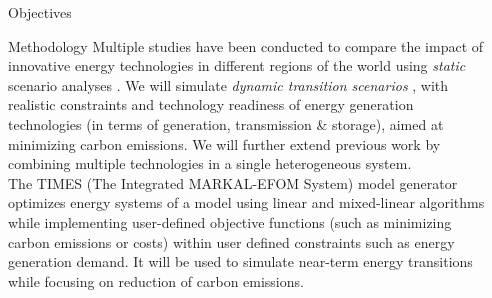 \documentclass[final]{beamer}
\newlength{\sepwid}
\newlength{\onecolwid}
\newlength{\threecolwid}
\begin{document}
\begin{frame}[t]
\begin{columns}[t,totalwidth=\threecolwid]
\begin{column}{\onecolwid}
\begin{alertblock}{Objectives}
\end{alertblock}
%
%


\begin{block}{Methodology}
Multiple studies have been conducted to compare the impact of innovative energy technologies in different regions of the world using \textit{static} scenario analyses \cite{chyong_chi_dynamics_2009} \cite{feng_system_2013} \cite{kikuchi_simulation-based_2017} \cite{li_energy_2010} \cite{pambudi_impact_2017} \cite{pambudi_future_2016}. We will simulate \textit{dynamic transition scenarios} \cite{jebaraj_review_2006} \cite{pfenninger_energy_2014} , with realistic constraints and technology readiness of energy generation technologies (in terms of generation, transmission \& storage), aimed at minimizing carbon emissions. We will further extend previous work by combining multiple technologies in a single heterogeneous system.\\

The TIMES (The Integrated MARKAL-EFOM System) model generator \cite{loulou_documentation_2005} \cite{seebregts_energy/environmental_2002} optimizes energy systems of a model using linear and mixed-linear algorithms while implementing user-defined objective functions (such as minimizing carbon emissions or costs) within user defined constraints such as energy generation demand. It will be used to simulate near-term energy transitions while focusing on reduction of carbon emissions. 


\end{block}


\end{column} %

\begin{column}{\sepwid}\end{column} %



\end{columns}
\end{frame}
\end{document}
